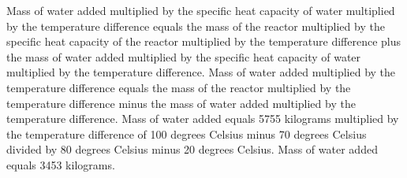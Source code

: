 Mass of water added multiplied by the specific heat capacity of water multiplied by the temperature difference equals the mass of the reactor multiplied by the specific heat capacity of the reactor multiplied by the temperature difference plus the mass of water added multiplied by the specific heat capacity of water multiplied by the temperature difference.  
Mass of water added multiplied by the temperature difference equals the mass of the reactor multiplied by the temperature difference minus the mass of water added multiplied by the temperature difference.  
Mass of water added equals 5755 kilograms multiplied by the temperature difference of 100 degrees Celsius minus 70 degrees Celsius divided by 80 degrees Celsius minus 20 degrees Celsius.  
Mass of water added equals 3453 kilograms.